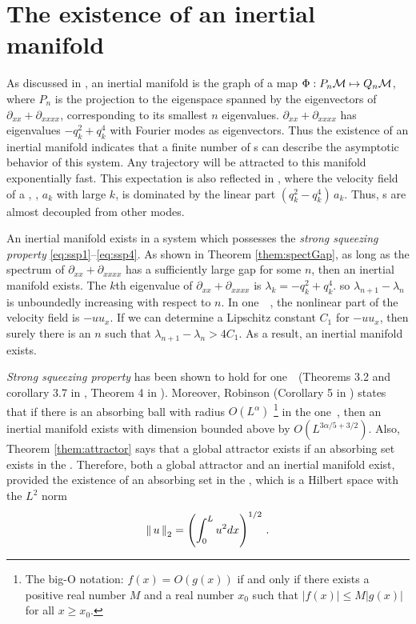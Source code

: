 \section{The existence of an inertial manifold}
\label{sect:ksrb}


As discussed in , an inertial manifold is the graph of a map
$\Phi : P_n\mathcal{M} \mapsto Q_n\mathcal{M}$, where $P_n$ is the projection to the eigenspace spanned
by the eigenvectors of $\partial_{xx} + \partial_{xxxx}$,
corresponding to its smallest $n$ eigenvalues. $\partial_{xx} + \partial_{xxxx}$
has eigenvalues $-q_k^2+q_k^4$ with
Fourier modes as eigenvectors. Thus the existence of an inertial manifold indicates that
a finite number of \lowFmode s can describe the asymptotic behavior
of this system. Any trajectory will be attracted to this manifold exponentially fast.
This expectation is also reflected in , where the velocity field
of a \highFmode, \ie, $a_k$ with large $k$, is dominated by the linear
part $( q_k^2 - q_k^4 )\, a_k$. Thus, \highFmode s are almost decoupled from other modes.

An inertial manifold exists in a system which possesses the \emph{strong squeezing property}
\eqref{eq:ssp1}--\eqref{eq:ssp4}. As shown in Theorem \ref{them:spectGap}, as long as
the spectrum of $\partial_{xx} + \partial_{xxxx}$ has a sufficiently large gap for some $n$,
then an inertial manifold exists. The $k$th eigenvalue of $\partial_{xx} + \partial_{xxxx}$
is $\lambda_k = -q_k^2+q_k^4$. so $\lambda_{n+1} - \lambda_n$ is unboundedly increasing
with respect to $n$. In one\dmn\ \KSe\ , the nonlinear part of the velocity
field is $-uu_x$. If we can determine a Lipschitz constant $C_1$ for $-uu_x$, then surely
there is an $n$ such that $\lambda_{n+1} - \lambda_n > 4C_1$. As a result, an inertial
manifold exists.

\emph{Strong squeezing property} has been shown to hold for one\dmn\ \KSe\ (Theorems 3.2 and corollary 3.7 in , Theorem 4 in ).
Moreover, Robinson (Corollary 5 in ) states that if there is an
absorbing ball with radius $O(L^{\alpha})$
\footnote{
  The big-O notation:
  $f(x) = O(g(x))$ if and only if there exists a positive real number $M$ and
  a real number $x_0$ such that $|f(x)| \le M |g(x)|$ for all $x \ge x_0$.
}
in the one\dmn\ \KSe, then an inertial manifold exists with dimension bounded above
by $O(L^{3\alpha/5 + 3/2})$. Also, Theorem \ref{them:attractor} says that a global attractor
exists if an absorbing set exists in the \statesp. Therefore,
both a global attractor and an inertial manifold exist, provided the existence
of an absorbing set in the \statesp, which is a Hilbert space with
the $L^2$ norm
\[
  \left\Arrowvert \, u \, \right\Arrowvert_{2} = \left(\int_{0}^L u^2 dx \right)^{1/2}
  \,.
\]


